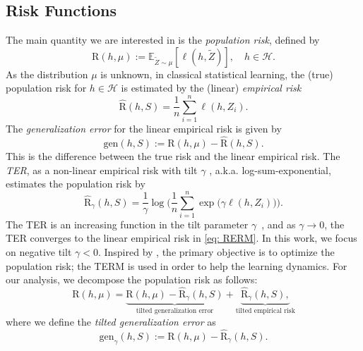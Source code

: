 \documentclass{article}
\theoremstyle{plain}
\theoremstyle{plain}
\theoremstyle{definition}
\theoremstyle{remark}
\newcommand{\RERM}{\widehat{\mathrm{R}}}
\newcommand{\RTERM}{\widehat{\mathrm{R}}_{\gamma}}
\newcommand{\RTrue}{\mathrm{R}}
\newcommand{\LA}{h}
\newcommand{\mbE}{\mathbb{E}}
\begin{document}
\subsection{ Risk Functions}
 The main quantity we are interested in is the {\it population risk}, defined by
\begin{equation}\label{eq: RTrue}
    \RTrue(\LA,\mu):=\mbE_{\tilde{Z}\sim\mu}[\ell(\LA,\tilde{Z})], \quad h\in\mathcal{H}. \nonumber 
\end{equation}
 As the distribution $\mu$ is unknown, in classical statistical learning, the (true) population risk for $h\in\mathcal{H}$ is estimated by the (linear) {\it empirical risk}  %
\begin{equation}\label{eq: RERM}\RERM(\LA,S)=\frac{1}{n}\sum_{i=1}^n\ell(\LA,Z_i).
\end{equation}
The {\it generalization error} for the linear empirical risk 
is given by 
\begin{equation}\label{eq:generror1}
   \mathrm{gen}(h,S) := \RTrue(\LA,\mu)- \RERM(\LA,S). 
\end{equation}
This is the difference between the true risk and the linear empirical risk. The {\it TER}, as a non-linear empirical risk with tilt $\gamma$ \citep{li2020tilted}, a.k.a. log-sum-exponential,  
estimates the population risk by
\begin{equation}\RTERM(\LA,S)=\frac{1}{\gamma}\log\Big(\frac{1}{n}\sum_{i=1}^n \exp\big(\gamma\ell(\LA,Z_i)\big)\Big).
\nonumber
\end{equation} 
The TER is an increasing function in the tilt parameter $\gamma$~\citep[Theorem~1]{li2023tilted}, and as $\gamma\rightarrow 0$, the TER converges to the linear empirical risk in \eqref{eq: RERM}. In this work, we focus on negative tilt $\gamma<0$.
Inspired by \citet{li2020tilted}, the primary objective is to optimize the population risk; the TERM is used in order to help the learning dynamics. %
For our analysis, we decompose the population risk as follows:
\begin{equation} \label{eq: def generalization error} 
 \RTrue(\LA,\mu) =    \underbrace{\RTrue(\LA,\mu)- \RTERM(\LA,S)}_{\text{tilted generalization error}}+ \underbrace{\RTERM(\LA,S),}_{\text{tilted empirical risk}}
\end{equation}
where we define the \textit{tilted generalization error} as
\begin{equation}
    \mathrm{gen}_{\gamma}(h,S):=\RTrue(\LA,\mu)- \RTERM(\LA,S) .\label{eq:tgen}
\end{equation}
\end{document}
